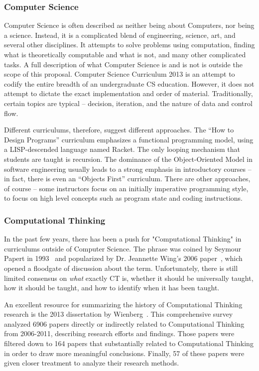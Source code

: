 \subsubsection{Computer Science}

Computer Science is often described as neither being about Computers, nor being a science.
Instead, it is a complicated blend of engineering, science, art, and several other disciplines.
It attempts to solve problems using computation, finding what is theoretically computable and what is not, and many other complicated tasks.
A full description of what Computer Science is and is not is outside the scope of this proposal.
Computer Science Curriculum 2013 \cite{CS2013} is an attempt to codify the entire breadth of an undergraduate CS education.
However, it does not attempt to dictate the exact implementation and order of material.
Traditionally, certain topics are typical -- decision, iteration, and the nature of data and control flow.

Different curriculums, therefore, suggest different approaches.
The ``How to Design Programs'' curriculum emphasizes a functional programming model, using a LISP-descended language named Racket.
The only looping mechanism that students are taught is recursion.
The dominance of the Object-Oriented Model in software engineering usually leads to a strong emphasis in introductory courses -- in fact, there is even an ``Objects First'' curriculum.
There are other approaches, of course -- some instructors focus on an initially imperative programming style, to focus on high level concepts such as program state and coding instructions.

\subsubsection{Computational Thinking}

In the past few years, there has been a push for "Computational Thinking" in curriculums outside of Computer Science. 
The phrase was coined by Seymour Papert in 1993~\cite{papert1996} and popularized by Dr. Jeannette Wing's 2006 paper~\cite{wing2006}, which opened a floodgate of discussion about the term. 
Unfortunately, there is still limited consensus on \textit{what} exactly CT is, whether it should be universally taught, how it should be taught, and how to identify when it has been taught.

An excellent resource for summarizing the history of Computational Thinking research is the 2013 dissertation by Wienberg~\cite{weinberg2013}. 
This comprehensive survey analyzed 6906 papers directly or indirectly related to Computational Thinking from 2006-2011, describing research efforts and findings. 
Those papers were filtered down to 164 papers that substantially related to Computational Thinking in order to draw more meaningful conclusions. 
Finally, 57 of these papers were given closer treatment to analyze their research methods.

